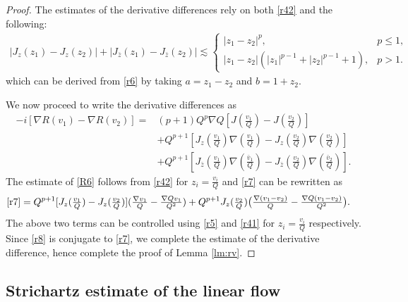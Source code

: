 \documentclass[12pt]{amsart}
\newcommand{\lsm}{\lesssim}
\begin{document}
\begin{proof}
The estimates of the derivative differences rely on both \eqref{r42} and the following: 
\begin{align}\label{r5}
|J_z(z_1)-J_z(z_2)|+|J_{\bar z}(z_1)-J_{\bar z} (z_2)|\lsm \begin{cases}
|z_1-z_2|^p, & p\le 1, \\
|z_1-z_2|(|z_1|^{p-1}+|z_2|^{p-1}+1), & p>1.
\end{cases}
\end{align}
which can be derived from \eqref{r6} by taking $a=z_1-z_2$ and $b=1+z_2$. 

We now proceed to write the derivative differences as
\begin{align}
-i[\nabla R(v_1)-\nabla R(v_2)]=&(p+1) Q^p\nabla Q[J(\tfrac{v_1}Q)-J(\tfrac{v_2}Q)]\label{R6}\\
&+Q^{p+1}[J_z(\tfrac{v_1}Q)\nabla(\tfrac{v_1}Q)-J_z(\tfrac{v_2}Q)\nabla(\tfrac{v_2}Q)]\label{r7}\\
&+Q^{p+1}[J_{\bar z}(\tfrac{v_1}Q)\nabla(\tfrac{\bar v_1}Q)-J_{\bar z}(\tfrac{v_2}Q)\nabla(\tfrac{\bar v_2}Q)].\label{r8}
\end{align} 
The estimate of \eqref{R6} follows from \eqref{r42} for $z_i=\tfrac {v_i}Q$ and \eqref{r7} can be rewritten as
\begin{align*}
\eqref{r7}=Q^{p+1}&[J_z(\tfrac{v_1}Q)-J_z(\tfrac{v_2}Q)](\tfrac{\nabla v_1}Q-\tfrac{\nabla Q v_1}{Q^2})+Q^{p+1}J_z(\tfrac{v_2}Q)\bigl(\tfrac{\nabla(v_1-v_2)}Q-\tfrac{\nabla Q(v_1-v_2)}{Q^2}\bigr). 
\end{align*}
The above two terms can be controlled using \eqref{r5} and \eqref{r41} for $z_i=\tfrac {v_i}Q$ respectively. Since \eqref{r8} is conjugate to \eqref{r7}, we complete the estimate of the derivative difference, hence complete the proof of Lemma \ref{lm:rv}. 
\end{proof}

\subsection{Strichartz estimate of the linear flow}
\end{document}
